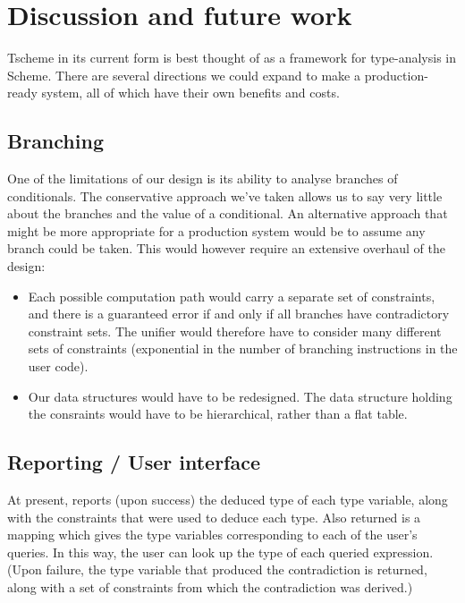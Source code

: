 \documentclass[a4paper]{article}
\begin{document}
\section{Discussion and future work}

Tscheme in its current form is best thought of as a framework for 
type-analysis in Scheme.  There are several directions we could expand to make 
a production-ready system, all of which have their own benefits and costs.

\subsection{Branching}
One of the limitations of our design is its ability to analyse branches of 
conditionals.  The conservative approach we've taken allows us to say very 
little about the branches and the value of a conditional.  An alternative 
approach that might be more appropriate for a production system would be to 
assume any branch could be taken.  This would however require an extensive
overhaul of the design:
\begin{itemize}
  \item Each possible computation path would carry a separate set of
    constraints, and there is a guaranteed error if and only if all branches
    have contradictory constraint sets.  The unifier would therefore have to
    consider many different sets of constraints (exponential in the number of
    branching instructions in the user code).
    
  \item Our data structures would have to be redesigned.  The data structure
    holding the consraints would have to be hierarchical, rather than a flat
    table.
\end{itemize}

\subsection{Reporting / User interface}
At present,  reports (upon success) the deduced type of each
type variable, along with the constraints that were used to deduce each type.
Also returned is a mapping which gives the type variables corresponding to each
of the user's queries.  In this way, the user can look up the type of each
queried expression.  (Upon failure, the type variable that produced the
contradiction is returned, along with a set of constraints from which the
contradiction was derived.)
\end{document}
